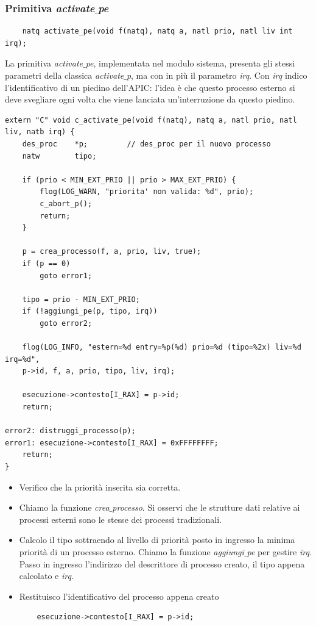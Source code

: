 \documentclass[11pt]{report}
\theoremstyle{definition}
\begin{document}
\subsubsection{Primitiva \emph{activate$\_$pe}}
\begin{verbatim}
	natq activate_pe(void f(natq), natq a, natl prio, natl liv int irq);
\end{verbatim}
La primitiva \emph{activate$\_$pe}, implementata nel modulo sistema, presenta gli stessi parametri della classica \emph{activate$\_$p}, ma con in più il parametro \emph{irq}. Con \emph{irq} indico l'identificativo di un piedino dell'APIC: l'idea è che questo processo esterno si deve svegliare ogni volta che viene lanciata un'interruzione da questo piedino.
\begin{verbatim}
extern "C" void c_activate_pe(void f(natq), natq a, natl prio, natl liv, natb irq) {
    des_proc	*p;			// des_proc per il nuovo processo
    natw		tipo;
		
    if (prio < MIN_EXT_PRIO || prio > MAX_EXT_PRIO) {
        flog(LOG_WARN, "priorita' non valida: %d", prio);
        c_abort_p();
        return;
    }
		
    p = crea_processo(f, a, prio, liv, true);
    if (p == 0)
        goto error1;
		
    tipo = prio - MIN_EXT_PRIO;
    if (!aggiungi_pe(p, tipo, irq))
        goto error2;
		
    flog(LOG_INFO, "estern=%d entry=%p(%d) prio=%d (tipo=%2x) liv=%d irq=%d", 
    p->id, f, a, prio, tipo, liv, irq);
		
    esecuzione->contesto[I_RAX] = p->id;
    return;
		
error2:	distruggi_processo(p);
error1: esecuzione->contesto[I_RAX] = 0xFFFFFFFF;
    return;
}
\end{verbatim}
\begin{itemize}
	\item Verifico che la priorità inserita sia corretta.
	\item Chiamo la funzione \emph{crea$\_$processo}. Si osservi che le strutture dati relative ai processi esterni sono le stesse dei processi tradizionali.
	\item Calcolo il tipo sottraendo al livello di priorità posto in ingresso la minima priorità di un processo esterno. Chiamo la funzione \emph{aggiungi$\_$pe} per gestire \emph{irq}. Passo in ingresso l'indirizzo del descrittore di processo creato, il tipo appena calcolato e \emph{irq}.
	\item Restituisco l'identificativo del processo appena creato
	\begin{verbatim}
	esecuzione->contesto[I_RAX] = p->id;
	\end{verbatim}
\end{itemize}
\end{document}
